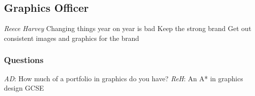 \documentclass[11pt]{meetingmins}
\begin{document}
\subsection{Graphics Officer}
\begin{items}
	\item
	\textit{Reece Harvey}
		\subitem
		Changing things year on year is bad
		\subitem
		Keep the strong brand
		\subitem
		Get out consistent images and graphics for the brand
\end{items}

\subsubsection{Questions}
\begin{items}
	\item
	\textit{AD}: How much of a portfolio in graphics do you have?
		\subitem
		\textit{ReH}:
			\subsubitem
			An A* in graphics design GCSE
\end{items}
\end{document}
